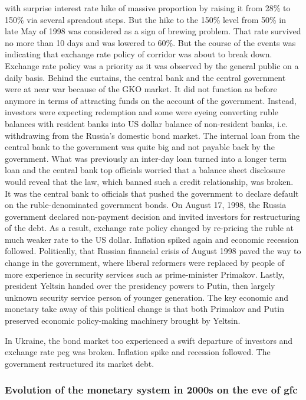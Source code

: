 with surprise interest rate hike of massive proportion by raising it
from 28\% to 150\% via several spreadout steps. But the hike to the 150\%
level from 50\% in late May of 1998 was considered as a sign of brewing
problem. That rate survived no more than 10 days and was lowered to 60\%.
But the course of the events was indicating that exchange rate policy of
corridor was about to break down. Exchange rate policy was a priority as
it was observed by the general public on a daily basis. Behind the
curtains, the central bank and the central government were at near war
because of the GKO market. It did not function as before anymore in
terms of attracting funds on the account of the government. Instead,
investors were expecting redemption and some were eyeing converting
ruble balances with resident banks into US dollar balance of
non-resident banks, i.e. withdrawing from the Russia's domestic bond
market. The internal loan from the central bank to the government was
quite big and not payable back by the government. What was previously an
inter-day loan turned into a longer term loan and the central bank top
officials worried that a balance sheet disclosure would reveal that the
law, which banned such a credit relationship, was broken. It was the
central bank to officials that pushed the government to declare default
on the ruble-denominated government bonds. On August 17, 1998, the
Russia government declared non-payment decision and invited investors
for restructuring of the debt. As a result, exchange rate policy changed
by re-pricing the ruble at much weaker rate to the US dollar. Inflation
spiked again and economic recession followed. Politically, that Russian
financial crisis of August 1998 paved the way to change in the
government, where liberal reformers were replaced by people of more
experience in security services such as prime-minister Primakov. Lastly,
president Yeltsin handed over the presidency powers to Putin, then
largely unknown security service person of younger generation. The key
economic and monetary take away of this political change is that both
Primakov and Putin preserved economic policy-making machinery brought by
Yeltsin.

In Ukraine, the bond market too experienced a swift departure of
investors and exchange rate peg was broken. Inflation spike and
recession followed. The government restructured its market debt.

\subsubsection{Evolution of the monetary system in 2000s on the eve of \ac{gfc}}


